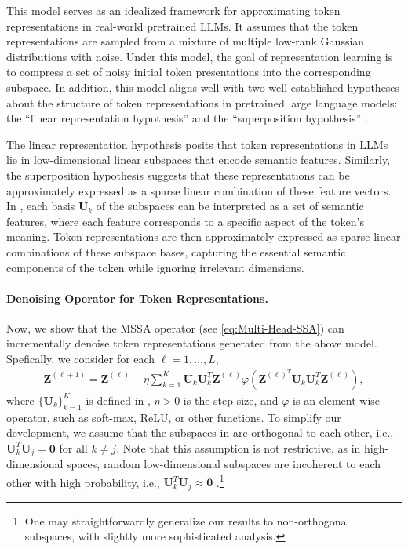 \documentclass[../../book-main.tex]{subfiles}
\begin{document}
This model serves as an idealized framework for approximating token representations in real-world pretrained LLMs. It assumes that the token representations are sampled from a mixture of multiple low-rank Gaussian distributions with noise. Under this model, the goal of representation learning is to compress a set of noisy initial token presentations into the corresponding subspace. In addition, this model aligns well with two well-established hypotheses about the structure of token representations in pretrained large language models: the ``linear representation hypothesis''  \citep{jiang2024origins,park2023linear} and the ``superposition hypothesis'' \citep{elhage2022toy,yun2021transformer}. 

\begin{remark}
    The linear representation hypothesis posits that token representations in LLMs lie in low-dimensional linear subspaces that encode semantic features. Similarly, the superposition hypothesis suggests that these representations can be approximately expressed as a sparse linear combination of these feature vectors. In , each basis $\bm U_k$ of the subspaces can be interpreted as a set of semantic features, where each feature corresponds to a specific aspect of the token's meaning. Token representations are then approximately expressed as sparse linear combinations of these subspace bases, capturing the essential semantic components of the token while ignoring irrelevant dimensions. 
\end{remark}

\paragraph{Denoising Operator for Token Representations.} Now, we show that the MSSA operator (see \eqref{eq:Multi-Head-SSA}) can incrementally denoise token representations generated from the above model. Spefically, we consider for each $\ell =1 ,\dots,L$, 
\begin{align}\label{eq:MSSA}
    \bm Z^{(\ell+1)} =  \bm Z^{(\ell)} + \eta \sum_{k=1}^K \bm U_k\bm U_k^T \bm Z^{(\ell)} \varphi \left(\bm Z^{(\ell)^T}\bm U_k\bm U_k^T\bm Z^{(\ell)} \right),
\end{align}
where $\{\bm U_k\}_{k=1}^K$ is defined in , $\eta > 0$ is the step size, and $\varphi$ is an element-wise operator, such as soft-max, ReLU, or other functions. To simplify our development, we assume that the subspaces in  are orthogonal to each other, i.e., $\bm U_k^T\bm U_j = \bm 0$ for all $k \neq j$. Note that this assumption is not restrictive, as in high-dimensional spaces, random low-dimensional subspaces are incoherent to each other with high probability, i.e., $\bm U_k^T\bm U_j \approx \bm 0$ \citep{Wright-Ma-2021}.\footnote{One may straightforwardly generalize our results to non-orthogonal subspaces, with slightly more sophisticated analysis.}   
\end{document}

